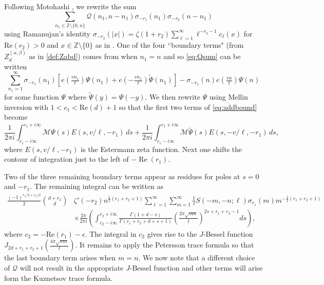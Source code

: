 \documentclass[]{article}
\renewcommand{\Re}{\operatorname{Re}}
\begin{document}
Following Motohashi \cite{motohashi1994binary}, we rewrite the sum 
\begin{equation}\label{eq:Qsum}\sum_{n_1 \in \mathbb{Z} \setminus \{ 0, n \} }  \mathcal{Q}(n_1,n-n_1)  \sigma_{-r_1}(n_1) \sigma_{-r_2}(n-n_1) \end{equation}
using Ramanujan's identity  
$\displaystyle
		\sigma_{-r_2}( | x | )   = 
        \zeta(1+r_2)   \sum_{\ell = 1}^\infty \ell^{-r_2 - 1} c_\ell (x)$
for  $\text{Re}(r_2) >  0$  and  $x \in \mathbb{Z} \setminus \{0 \}$  	
as in \cite[(2)]{murty2013ramanujan}. One of the four ``boundary terms" (from $Z^{(\alpha,\beta)}_d$ as in \eqref{def:Zabd}) comes from when $n_1=n$ and so \eqref{eq:Qsum} can be written 
\begin{equation}\label{eq:addbound}
\sum_{n_1=1}^\infty \sigma_{-r_1}(n_1) \left[ e(\tfrac{v n_1}{\ell}) \Psi(n_1)  + e(-\tfrac{v n_1}{\ell}) \widetilde\Psi(n_1) \right] - \sigma_{-r_1}(n) e(\tfrac{vn }{\ell})  \Psi(n)
\end{equation}
for some function $\Psi$ where  $\widetilde\Psi(y) = \Psi(-y) $. We then rewrite $\Psi$ using Mellin inversion with  $1 < c_1 < \text{Re}(d)+ 1$ so that the first two terms of \eqref{eq:addbound} become 
\begin{equation}
 \frac{1}{2 \pi i } \int_{c_1-i \infty}^{c_1+i\infty}  \mathcal{M}  \Psi(s) E(s,v/\ell,-r_1)\, ds 
            + \frac{1}{2 \pi i }	\int_{c_1-i \infty}^{c_1+i\infty} \mathcal{M} \widetilde\Psi(s) E(s,-v/\ell,-r_1)\, ds ,
\end{equation}
where $E(s,v/\ell,-r_1)$ is the Estermann zeta function. Next one shifts the contour of integration just to the left of $-\Re(r_1)$.

Two of the three remaining boundary terms appear as residues for poles at $s=0$ and $-r_1$. The remaining integral can be written as 
\begin{equation}\label{eq:integral_after_contour_change}
           \begin{split}
    \frac{  (-1)^{r_1/2+r_2/2}  }  {2}{d+r_2 \choose d} &\zeta'(-r_2) n^{\frac{1}{2}(r_1+r_2+1)}  \sum_{\ell=1}^\infty \sum_{m=1}^\infty \frac{1}{\ell} S(-m,-n; \ell)    \sigma_{r_1}(m) m^{-\frac{1}{2} (r_1+r_2+1)}   \\
           & \times \frac{2\pi}{2 \pi i } \left( \int_{c_2-i \infty}^{c_2+i \infty}   \frac{\Gamma(1+d-s)}{\Gamma(r_1+r_2+d+s+1)}  \left( \frac{2 \pi \sqrt{mn}}{\ell} \right)^{2s+r_1+r_2-1} ds   \right) ,
\end{split}
\end{equation}
where $c_2=-\text{Re}(r_1)-\epsilon$. The integral in $c_2$  gives rise to the $J$-Bessel function $J_{2d+r_1+r_2+1} ( \tfrac{4 \pi \sqrt{mn}}{\ell})$. It remains to apply the Petersson trace formula so that the last boundary term arises when $m=n$. We now note that a different choice of $\mathcal{Q}$ will not result in the appropriate $J$-Bessel function and other terms will arise form the Kuznetsov trace formula. 
\end{document}
